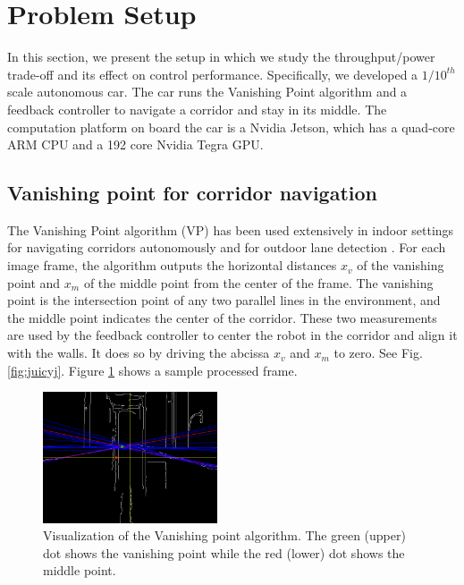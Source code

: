 \section{Problem Setup}
\label{sec:problemSetup}
In this section, we present the setup in which we study the throughput/power trade-off and its effect on control performance. 
Specifically, we developed a $1/10^{th}$ scale autonomous car.
The car runs the Vanishing Point algorithm \cite{VP1,VP2} and a feedback controller to navigate a corridor and stay in its middle.
The computation platform on board the car is a Nvidia Jetson, which has a quad-core ARM CPU and a 192 core Nvidia Tegra GPU.


\subsection{Vanishing point for corridor navigation}
\label{sec:vp}
The Vanishing Point algorithm (VP) \cite{VP1} has been used extensively in indoor settings for navigating corridors autonomously \cite{VP2, VP3} and for outdoor lane detection \cite{gallagher2002ground}.
For each image frame, the algorithm outputs the horizontal distances $x_v$ of the vanishing point and $x_m$ of the middle point from the center of the frame. 
The vanishing point is the intersection point of any two parallel lines in the environment, and the middle point indicates the center of the corridor. 
These two measurements are used by the feedback controller to center the robot in the corridor and align it with the walls. 
It does so by driving the abcissa $x_v$ and $x_m$ to zero. 
See Fig. \ref{fig:juicyj}.
Figure \ref{fig:vp_viz} shows a sample processed frame.

\begin{figure}[t]
\centering
\includegraphics[width=0.46\textwidth]{Figs/vpmpimages/image_23_-30_-51.png}
\caption{Visualization of the Vanishing point algorithm. The green (upper) dot shows the vanishing point while the red (lower) dot shows the middle point.}
\label{fig:vp_viz} %
\end{figure}

